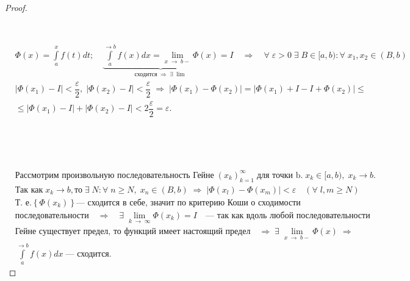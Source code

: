 \documentclass[../main.tex]{subfiles}
\begin{document}
\begin{proof}

    ~

    \boxed{\Rightarrow} 

    ~
    
    \(
    \begin{aligned}
        &\Phi(x) = \displaystyle\int\limits_{ a}^{ x} f(t)dt;\quad \underbrace{ \displaystyle\int\limits_{ a}^{ \rightarrow b} f(x)dx = \lim\limits_{ x \; \rightarrow \; b-} \Phi(x)}_{\text{сходится} \; \Rightarrow \; \exists \; \lim } = I \quad\Rightarrow\quad \forall \; \varepsilon> 0 \; \exists \; B \in [a, b): \forall \; x_1, x_2 \in (B, b) \\[5pt] 
        &\left| \Phi(x_1) - I\right| < \dfrac{ \varepsilon}{ 2}, \; \left| \Phi(x_2) - I\right| < \dfrac{ \varepsilon}{ 2} \;\Rightarrow\; \left| \Phi(x_1) - \Phi(x_2)\right| = \left| \Phi(x_1) + I - I + \Phi(x_2)\right| \leq \\[5pt] 
        &\leq \left| \Phi(x_1) - I\right| + \left| \Phi(x_2) - I\right| < 2 \dfrac{ \varepsilon}{ 2} = \varepsilon.
    \end{aligned}
    \)

    ~
    
    \newpage

    \boxed{\Leftarrow}

    ~

    \( 
    \begin{aligned}
        &\text{Рассмотрим произвольную последовательность Гейне}\; (x_k)_{k = 1}^\infty \; \text{для точки b.}\; x_k \in [a, b), \; x_k \rightarrow  b. \\[5pt]
        &\text{Так как} \; x_k \rightarrow b, \text{то} \; \exists \; N: \forall \; n \geq  N, \; x_n \in (B, b) \; \Rightarrow \; \left| \Phi(x_l) - \Phi(x_m)\right| < \varepsilon \quad ( \forall \; l, m \geq N ) \\[5pt]
        &\text{Т. е.} \left\{ \Phi(x_k)\right\}  \text{--- сходится в себе, значит по критерию Коши о сходимости} \\[5 pt] 
        &\text{последовательности}\quad \Rightarrow\quad \exists \; \lim\limits_{ k \; \rightarrow \; \infty} \Phi(x_k) = I\quad \text{--- так как вдоль любой последовательности} \\[5pt] 
        &\text{Гейне существует предел, то функций имеет настоящий предел}\quad \Longrightarrow \; \exists \; \lim\limits_{ x \; \rightarrow \; b-} \Phi(x) \; \Rightarrow \\
        &\displaystyle\int\limits_{ a}^{ \rightarrow b} f(x)dx \; \text{--- сходится}. 
     \end{aligned}
    \)
\end{proof}
\end{document}
